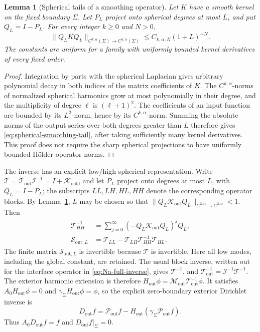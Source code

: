 \documentclass[11pt,a4paper,twoside]{article}
\numberwithin{equation}{section}
\newtheorem{lemma}[theorem]{Lemma}
\theoremstyle{definition}
\theoremstyle{remark}
\begin{document}
\begin{lemma}[Spherical tails of a smoothing operator]
\label{lem:spherical-smoothing-tails}
Let \(K\) have a smooth kernel on the fixed boundary \(\Sigma\).
Let \(P_L\) project onto spherical degrees at most \(L\), and
put \(Q_L=I-P_L\).
For every integer \(k\ge0\) and \(N>0\),
\begin{equation}\label{eq:spherical-smoothing-tail}
\|Q_LKQ_L\|_{C^{k,\alpha}(\Sigma)\to C^{k,\alpha}(\Sigma)}
\le C_{k,\alpha,N}(1+L)^{-N}.
\end{equation}
The constants are uniform for a family with uniformly bounded
kernel derivatives of every fixed order.
\end{lemma}
\begin{proof}
Integration by parts with the spherical Laplacian gives arbitrary
polynomial decay in both indices of the matrix coefficients of
\(K\). The \(C^{k,\alpha}\)-norms of normalized spherical
harmonics grow at most polynomially in their degree, and the
multiplicity of degree \(\ell\) is \((\ell+1)^2\).
The coefficients of an input function are bounded by its
\(L^2\)-norm, hence by its \(C^{k,\alpha}\)-norm. Summing the
absolute norms of the output series over both degrees greater
than \(L\) therefore gives \eqref{eq:spherical-smoothing-tail},
after taking sufficiently many kernel derivatives. This proof
does not require the sharp spherical projections to have uniformly
bounded H\"older operator norms.
\end{proof}

The inverse has an explicit low/high spherical representation.
Write \(\mathcal T=\mathcal T_{\mathrm{out}}\mathcal I^{-1}
=I+\mathcal K_{\mathrm{out}}\), and let \(P_L\) project onto
degrees at most \(L\), with \(Q_L=I-P_L\); the subscripts
\(LL,LH,HL,HH\) denote the corresponding operator blocks.
By Lemma~\ref{lem:spherical-smoothing-tails}, \(L\) may be
chosen so that
\(\|Q_L\mathcal K_{\mathrm{out}}Q_L\|_{C^{2,\alpha}\to C^{2,\alpha}}<1\).
Then
\begin{equation}\label{eq:outer-high-inverse}
\begin{aligned}
\mathcal T_{HH}^{-1}
&=\sum_{j=0}^{\infty}(-Q_L\mathcal K_{\mathrm{out}}Q_L)^jQ_L,\\
\mathcal S_{\mathrm{out},L}
&=\mathcal T_{LL}-\mathcal T_{LH}\mathcal T_{HH}^{-1}\mathcal T_{HL}.
\end{aligned}
\end{equation}
The finite matrix \(\mathcal S_{\mathrm{out},L}\) is invertible
because \(\mathcal T\) is invertible. Here all low modes, including
the global constant, are retained. The usual block inverse, written
out for the interface operator in \eqref{eq:Na-full-inverse}, gives
\(\mathcal T^{-1}\), and
\(\mathcal T_{\mathrm{out}}^{-1}=\mathcal I^{-1}\mathcal T^{-1}\).
The exterior harmonic extension is therefore
\(H_{\mathrm{out}}\phi=
\mathcal M_{\mathrm{out}}\mathcal T_{\mathrm{out}}^{-1}\phi\).
It satisfies \(A_0H_{\mathrm{out}}\phi=0\) and
\(\gamma_\Sigma H_{\mathrm{out}}\phi=\phi\), so the explicit
zero-boundary exterior Dirichlet inverse is
\[
D_{\mathrm{out}}f
=
\mathcal P_{\mathrm{out}}f
-
H_{\mathrm{out}}
\left(
\gamma_\Sigma
\mathcal P_{\mathrm{out}}f
\right).
\]
Thus \(A_0D_{\mathrm{out}}f=f\) and
\(D_{\mathrm{out}}f|_\Sigma=0\).
\end{document}
